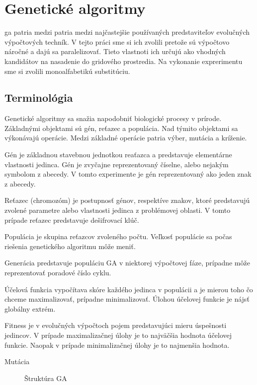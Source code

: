 \section{Genetické algoritmy}
\acrfull{ga} patria medzi patria medzi najčastejšie používaných predstaviteľov evolučných výpočtových techník.
V tejto práci sme si ich zvolili pretože sú výpočtovo náročné a dajú sa paralelizovať.
Tieto vlastnoti ich určujú ako vhodných kandidátov na nasadenie do gridového prostredia.
Na vykonanie exprerimentu sme si zvolili monoalfabetikú substitúciu.

\subsection{Terminológia}
Genetické algoritmy sa snažia napodobniť biologické procesy v prírode.
Základnými objektami sú gén, reťazec a populácia. Nad týmito objektami sa výkonávajú operácie.
Medzi základné operácie patria výber, mutácia a kríženie.

Gén je základnou stavebnou jednotkou reaťazca a predstavuje elementárne vlastnosti jedinca.
Gén je zvyčajne reprezentovaný číselne, alebo nejakým symbolom z abecedy.
V tomto experimente je gén reprezentovaný ako jeden znak z abecedy.

Reťazec (chromozóm) je postupnosť génov, respektíve znakov, ktoré predstavujú zvolené parametre alebo vlastnosti jedinca
z problémovej oblasti. V tomto prípade reťazec predstavuje dešifrovací klúč. 

Populácia je skupina reťazcov zvoleného počtu. Veľkosť populácie sa počas riešenia genetického algoritmu môže meniť.

Generácia predstavuje populáciu GA v niektorej výpočtovej fáze, prípadne môže reprezentovať poradové číslo cyklu.

Účelová funkcia vypočítava skóre každého jedinca v populácii a je mierou toho čo chceme maximalizovať, prípadne minimalizovať.
Úlohou účelovej funkcie je nájsť globálny extrém.

Fitness je v evolučných výpočtoch pojem predstavujúci mieru úspešnosti jedincov.
V prípade maximalizačnej úlohy je to najväčšia hodnota účelovej funkcie. Naopak v prípade minimalizačnej úlohy je to najmenšia hodnota.

Mutácia 

\begin{figure}[!h]
  \centering
  \def\svgwidth{\columnwidth}
  
  \caption{Štruktúra GA}
  \label{img:ga}
\end{figure}


